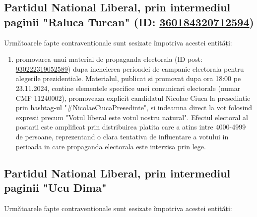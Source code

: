 \documentclass[a4paper,12pt]{article}
\begin{document}
\vspace{0.5cm}

\subsection{Partidul National Liberal, prin intermediul paginii "Raluca Turcan" (ID: \href{https://www.facebook.com/ads/library/?id=360184320712594}{360184320712594})}
Următoarele fapte contravenționale sunt sesizate împotriva acestei entități:

\begin{enumerate}[leftmargin=*, label=\arabic*.)]
    \item promovarea unui material de propaganda electorala (ID post: \href{https://www.facebook.com/ads/library/?id=930222319052589}{930222319052589}) dupa incheierea perioadei de campanie electorala pentru alegerile prezidentiale. Materialul, publicat si promovat dupa ora 18:00 pe 23.11.2024, contine elementele specifice unei comunicari electorale (numar CMF 11240002), promoveaza explicit candidatul Nicolae Ciuca la presedintie prin hashtag-ul "\#NicolaeCiucaPresedinte", si indeamna direct la vot folosind expresii precum "Votul liberal este votul nostru natural". Efectul electoral al postarii este amplificat prin distribuirea platita care a atins intre 4000-4999 de persoane, reprezentand o clara tentativa de influentare a votului in perioada in care propaganda electorala este interzisa prin lege.
\end{enumerate}

\vspace{0.5cm}

\subsection{Partidul National Liberal, prin intermediul paginii "Ucu Dima"}
Următoarele fapte contravenționale sunt sesizate împotriva acestei entități:
\end{document}
